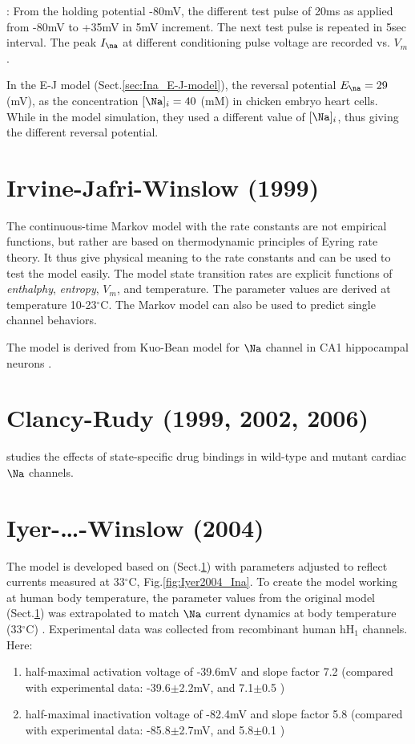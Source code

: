 \citep{lee1999}: From the holding potential -80mV, the different test pulse of
20ms as applied from -80mV to +35mV in 5mV increment. The next test pulse is
repeated in 5sec interval. The peak $I_\na$ at different conditioning pulse
voltage are recorded vs.
$V_m$.

In the E-J model \citep{ebihara1980fsc} (Sect.\ref{sec:Ina_E-J-model}), the
reversal potential $E_\na = 29$ (mV), as the concentration $[\Na]_i = 40$ (mM)
in chicken embryo heart cells. While in the model simulation, they used a
different value of $[\Na]_i$, thus giving the different reversal potential.
\section{Irvine-Jafri-Winslow (1999)}
\label{sec:Ina_Irvine1999}

The continuous-time Markov model with the rate constants are not empirical
functions, but rather are based on thermodynamic principles of Eyring rate
theory. It thus give physical meaning to the rate constants and can be used to
test the model easily.
The model state transition rates are explicit functions of {\it enthalphy}, {\it
entropy}, $V_m$, and temperature. The parameter values are derived at
temperature 10-23$^\circ$C. The Markov model can also be used to predict single
channel behaviors.

The model is derived from Kuo-Bean model for $\Na$ channel in CA1 hippocampal
neurons \citep{kuo1994}. 
\section{Clancy-Rudy (1999, 2002, 2006)}

\citep{clancy1999, clancy2002, clancy2006}

\citep{clancy2006} studies the effects of state-specific drug bindings in
wild-type and mutant cardiac $\Na$ channels.

\section{Iyer-\ldots-Winslow (2004)}
\label{sec:Ina_Iyer2004}

The model is developed based on \citep{irvine1999}
(Sect.\ref{sec:Ina_Irvine1999}) with parameters adjusted to reflect currents
measured at 33$^\circ$C, Fig.\ref{fig:Iyer2004_Ina}.
To create the model working at human body temperature, the parameter values from
the original model (Sect.\ref{sec:Ina_Irvine1999}) was extrapolated to match
$\Na$ current dynamics at body temperature (33$^\circ$C) \citep{nagatomo1998,
wang2000}. Experimental data was collected from recombinant human hH$_1$
channels. Here:
\begin{enumerate}
  \item  half-maximal activation
voltage of -39.6mV and slope factor 7.2 (compared with experimental data:
-39.6$\pm$2.2mV, and 7.1$\pm$0.5 \citep{nagatomo1998})
  \item half-maximal inactivation
voltage of -82.4mV and slope factor 5.8 (compared with experimental data:
-85.8$\pm$2.7mV, and 5.8$\pm$0.1 \citep{nagatomo1998})
\end{enumerate} 

